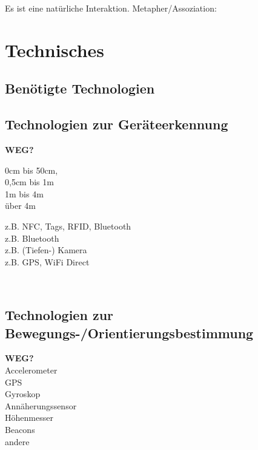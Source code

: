 \checkbox{\metaphor} Es ist eine natürliche Interaktion. Metapher/Assoziation: \metaphordesc


\section*{Technisches}

\subsection*{Benötigte Technologien}
\requiredTechnologies

\subsection*{Technologien zur Geräteerkennung}
\textbf{WEG?} \\
\begin{minipage}{0.3\textwidth}
\checkbox{\technologyObjectIntimate} 0cm bis 50cm, \\
\checkbox{\technologyObjectPersonal} 0,5cm bis 1m \\
\checkbox{\technologyObjectSocial} 1m bis 4m \\
\checkbox{\technologyObjectPublic} über 4m 
\end{minipage}
\begin{minipage}{0.5\textwidth}
z.B. NFC, Tags, RFID, Bluetooth \\
z.B. Bluetooth \\
z.B. (Tiefen-) Kamera \\
z.B. GPS, WiFi Direct
\end{minipage}\\

\subsection*{Technologien zur Bewegungs-/Orientierungsbestimmung}
\textbf{WEG?} \\
\checkbox{\technologyOrientationAccelerometer} Accelerometer \\
\checkbox{\technologyOrientationGPS} GPS \\
\checkbox{\technologyOrientationGyroskop} Gyroskop \\
\checkbox{\technologyOrientationAnnaeherung} Annäherungssensor \\
\checkbox{\technologyOrientationHoehe} Höhenmesser \\
\checkbox{\technologyOrientationBeacons} Beacons \\
\checkbox{\technologyOrientationOther} andere \\


